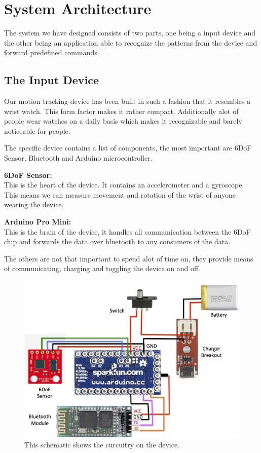 \section{System Architecture}
The system we have designed consists of two parts,
one being a input device
and the other being an application able to recognize the patterns from the device and forward predefined commands.

\subsection{The Input Device}
Our motion tracking device has been built in such a fashion that it resembles a wrist watch.
This form factor makes it rather compact.
Additionally alot of people wear watches on a daily basis which makes it recognizable and barely noticeable for people.

The specific device contains a list of components, the most important are 6DoF Sensor, Bluetooth and Arduino microcontroller.

\textbf{6DoF Sensor:}\\
This is the heart of the device. It contains an accelerometer and a gyroscope. This means we can measure movement and rotation of the wrist of anyone wearing the device.

\textbf{Arduino Pro Mini:}\\
This is the brain of the device, it handles all communication between the 6DoF chip and forwards the data over bluetooth to any consumers of the data.

The others are not that important to spend alot of time on, they provide means of communicating, charging and toggling the device on and off.

\begin{figure}[!h]
\centering
\includegraphics[width=0.9\columnwidth]{img/device_schematic}
\caption{This schematic shows the curcuitry on the device.}
\label{fig:figure1}
\end{figure}

